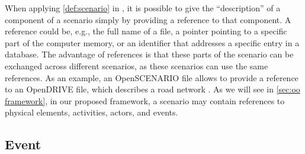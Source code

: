 


\cstartc When applying \cref{def:scenario} in , it is possible 
to give the ``description'' of a component of a scenario simply by providing a reference to that component. \cendc
A reference could be, e.g., the full name of a file, a pointer pointing to a specific part of the computer memory, or an identifier that addresses a specific entry in a database.
The advantage of references is that these parts of the scenario can be exchanged across different scenarios, as these scenarios can use the same references. 
As an example, an OpenSCENARIO file allows to provide a reference to an OpenDRIVE file, which describes a road network \autocite{dupuis2010opendrive}. As we will see in \cref{sec:oo framework}, in our proposed \cstartb framework\cendb, a scenario may contain references to \cstartc physical elements\cendc, activities, actors, and events.
 


\subsection{Event}
\label{sec:event}

